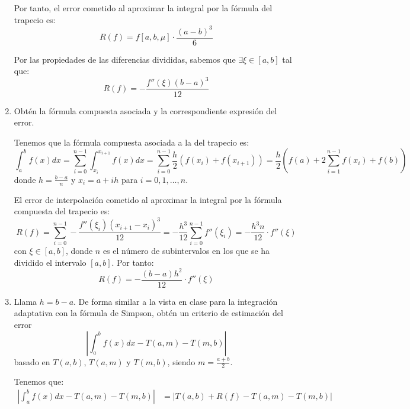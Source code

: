 \begin{ejercicio}
\begin{enumerate}
        Por tanto, el error cometido al aproximar la integral por la fórmula del trapecio es:
        \begin{equation*}
            R(f) = f[a,b,\mu]\cdot \dfrac{(a-b)^3}{6}
        \end{equation*}

        Por las propiedades de las diferencias divididas, sabemos que $\exists \xi\in [a,b]$ tal que:
        \begin{equation*}
            R(f) = -\dfrac{f''(\xi)(b-a)^3}{12}
        \end{equation*}
        \item Obtén la fórmula compuesta asociada y la correspondiente expresión del error.
        
        Tenemos que la fórmula compuesta asociada a la del trapecio es:
        \begin{equation*}
            \int_{a}^{b} f(x) dx = \sum_{i=0}^{n-1}\int_{x_i}^{x_{i+1}} f(x) dx = \sum_{i=0}^{n-1} \dfrac{h}{2}\left(f(x_i) + f(x_{i+1})\right)
            = \dfrac{h}{2}\left(f(a) + 2\sum_{i=1}^{n-1} f(x_i) + f(b)\right)
        \end{equation*}
        donde $h = \frac{b-a}{n}$ y $x_i = a + ih$ para $i=0,1,\ldots,n$.

        El error de interpolación cometido al aproximar la integral por la fórmula compuesta del trapecio es:
        \begin{equation*}
            R(f) = \sum_{i=0}^{n-1} -\dfrac{f''(\xi_i)(x_{i+1}-x_i)^3}{12} = -\dfrac{h^3}{12}\sum_{i=0}^{n-1} f''(\xi_i)
            = -\dfrac{h^3n}{12}\cdot f''(\xi)
        \end{equation*}
        con $\xi\in [a,b]$, donde $n$ es el número de subintervalos en los que se ha dividido el intervalo $[a,b]$. Por tanto:
        \begin{equation*}
            R(f) = -\dfrac{(b-a)h^2}{12}\cdot f''(\xi)
        \end{equation*}
        \item Llama $h = b - a$. De forma similar a la vista en clase para la integración adaptativa con la fórmula de Simpson, obtén un criterio de estimación del error
        \begin{equation*}
            \left|\int_{a}^{b} f(x) dx - T(a, m) - T(m, b)\right|
        \end{equation*}
        basado en $T(a, b)$, $T(a, m)$ y $T(m, b)$, siendo $m = \frac{a+b}{2}$.


        Tenemos que:
        \begin{align*}
            \left|\int_{a}^{b} f(x) dx - T(a, m) - T(m, b)\right| &= \left|T(a, b) + R(f) - T(a, m) - T(m, b)\right|
        \end{align*}


\end{enumerate}
\end{ejercicio}
